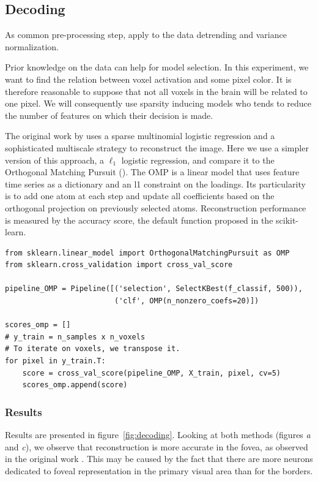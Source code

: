 \documentclass{frontiersSCNS} %
\begin{document}
\subsection{Decoding}

As common pre-processing step, apply to the data detrending and variance
normalization.

Prior knowledge on the data can help for model selection. In this experiment, we
want to find the relation between voxel activation and some pixel color. It is
therefore reasonable to suppose that not all voxels in the brain will be related to one
pixel. We will consequently use sparsity inducing models who tends to
reduce the number of features on which their decision is made.

The original work by \cite{miyawaki2008} uses a sparse multinomial
logistic regression and a sophisticated multiscale strategy to reconstruct the image.
Here we use a simpler version of this approach, a $\ell_1$ logistic
regression, and compare it to the Orthogonal
Matching Pursuit (\cite{mallat1993}). The OMP is a linear model that uses
feature time series as a dictionary and an l1 constraint on the loadings. Its
particularity is to add one atom at each step and update all coefficients
based on the orthogonal projection on previously selected atoms.
Reconstruction performance is measured by the accuracy score, the default
function proposed in the scikit-learn.

\begin{lstlisting}
from sklearn.linear_model import OrthogonalMatchingPursuit as OMP
from sklearn.cross_validation import cross_val_score

pipeline_OMP = Pipeline([('selection', SelectKBest(f_classif, 500)),
                         ('clf', OMP(n_nonzero_coefs=20)])

scores_omp = []
# y_train = n_samples x n_voxels
# To iterate on voxels, we transpose it.
for pixel in y_train.T:
    score = cross_val_score(pipeline_OMP, X_train, pixel, cv=5)
    scores_omp.append(score)
\end{lstlisting}

\subsubsection{Results}

Results are presented in figure~\ref{fig:decoding}.
Looking at both methods (figures \textit{a} and \textit{c}), we observe that reconstruction
is more accurate in the fovea, as observed in the original work \citep{miyawaki2008}.
This may be caused by the fact that there are more neurons dedicated to foveal
representation in the primary visual area than for the borders.
\end{document}
